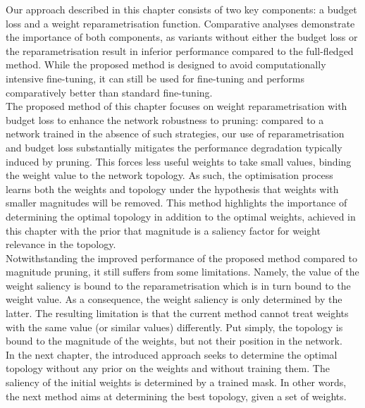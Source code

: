 Our approach described in this chapter consists of two key components: a budget
loss and a weight reparametrisation function. Comparative analyses demonstrate
the importance of both components, as variants without either the budget loss
or the reparametrisation result in inferior performance compared to the
full-fledged method. While the proposed method is designed to avoid
computationally intensive fine-tuning, it can still be used for fine-tuning and
performs comparatively better than standard fine-tuning.\\

The proposed method of this chapter focuses on weight reparametrisation with
budget loss to enhance the network robustness to pruning: compared to a network
trained in the absence of such strategies, our use of reparametrisation and
budget loss substantially mitigates the performance degradation typically
induced by pruning. This forces less useful weights to take small values,
binding the weight value to the network topology. As such, the optimisation
process learns both the weights and topology under the hypothesis that weights
with smaller magnitudes will be removed. This method highlights the importance
of determining the optimal topology in addition to the optimal weights, achieved
in this chapter with the prior that magnitude is a saliency factor for weight
relevance in the topology.\\

Notwithstanding the improved performance of the proposed method compared to
magnitude pruning, it still suffers from some limitations. Namely, the value of
the weight saliency is bound to the reparametrisation which is in turn bound to
the weight value. As a consequence, the weight saliency is only determined by
the latter. The resulting limitation is that the current method cannot treat
weights with the same value (or similar values) differently. Put simply, the
topology is bound to the magnitude of the weights, but not their position in the
network.\\

In the next chapter, the introduced approach seeks to determine the optimal
topology without any prior on the weights and without training them. The
saliency of the initial weights is determined by a trained mask. In other words,
the next method aims at determining the best topology, given a set of weights.

